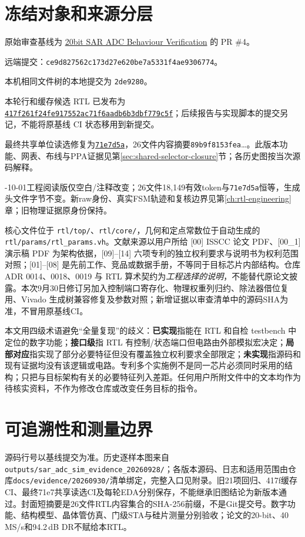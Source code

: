\documentclass[UTF8,fontset=fandol,11pt,a4paper,openany]{ctexrep}
\newcommand{\code}[1]{\nolinkurl{#1}}
\newcommand{\repo}{\href{https://github.com/defineiocc02/20bit_SAR_ADC_Behaviour_Verification}{20bit SAR ADC Behaviour Verification}}
\newcommand{\grade}[1]{\textbf{#1}}
\begin{document}
\section{冻结对象和来源分层}
原始审查基线为 \repo{} 的 PR \#4。
\par\noindent 远端提交：\code{ce9d827562c173d27e620be7a5331f4ae9306774}。
\par\noindent 本机相同文件树的本地提交为 \code{2de9280}。
\par\noindent 本轮行和缓存候选 RTL 已发布为 \href{https://github.com/defineiocc02/20bit_SAR_ADC_Behaviour_Verification/commit/417f261f24fe917552ac71f6aadb6b3dbf779c5f}{\code{417f261f24fe917552ac71f6aadb6b3dbf779c5f}}；后续报告与实现脚本的提交另记，不能将原基线 CI 状态移用到新提交。
\par\noindent 最终共享单位读选修复为\href{https://github.com/defineiocc02/20bit_SAR_ADC_Behaviour_Verification/commit/71e7d5a017246340b9fa1f71cbbe99e20b6503f6}{\code{71e7d5a}}，26文件内容摘要\code{89b9f8153fea}\ldots{}。此版本功能、网表、布线与PPA证据见第\ref{sec:shared-selector-closure}节；各历史图按当次源码解释。
\par{}-10-01工程阅读版仅空白/注释改变；26文件18,149有效token与\code{71e7d5a}恒等，生成头文件字节不变。新raw身份、真实FSM轨迹和复核边界见第\ref{ch:rtl-engineering}章；旧物理证据原身份保持。
\par{}核心文件位于 \code{rtl/top/}、\code{rtl/core/}，几何和定点常数位于自动生成的 \code{rtl/params/rtl_params.vh}。文献来源以用户所给 [00] ISSCC 论文 PDF、[00\_1] 演示稿 PDF 为架构依据，[09]--[14] 六项专利的独立权利要求与说明书为权利范围对照；[01]--[08] 是先前工作、竞品或数据手册，不等同于目标芯片内部结构。仓库 ADR 0014、0018、0019 与 RTL 算术契约为\emph{工程选择的说明}，不能替代原论文披露。本次9月30日修订另加入控制端口寄存化、物理权重列归约、除法器借位复用、Vivado 生成树兼容修复及参数对照；新增证据以审查清单中的源码SHA为准，不冒用原基线CI。

本文用四级术语避免“全量复现”的歧义：\grade{已实现}指能在 RTL 和自检 testbench 中定位的数字功能；\grade{接口级}指 RTL 有控制/状态端口但电路由外部模拟宏决定；\grade{局部对应}指实现了部分必要特征但没有覆盖独立权利要求全部限定；\grade{未实现}指源码和现有证据均没有该逻辑或电路。专利多个实施例不是同一芯片必须同时采用的结构；只把与目标架构有关的必要特征列入差距。任何用户所附文件中的文本均作为待核实资料，不作为修改仓库或改变任务目标的指令。

\section{可追溯性和测量边界}
\begingroup\raggedright
源码行号以基线提交为准。历史逐样本图来自\code{outputs/sar_adc_sim_evidence_20260928/}；各版本源码、日志和适用范围由仓库\code{docs/evidence/20260930/}清单绑定，完整入口见附录。旧21项回归、417f缓存CI、最终71e7共享读选CI及每轮EDA分别保存，不能继承旧图结论为新版本通过。封面短摘要是26文件RTL内容集合的SHA-256前缀，不是Git提交号。数字功能、结构模型、晶体管仿真、门级STA与硅片测量分别验收；论文的20-bit、40\,MS/s和94.2\,dB DR不赋给本RTL。\enlargethispage{2\baselineskip}\par\endgroup
\end{document}
